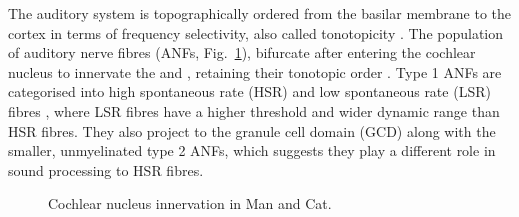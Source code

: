 
The auditory system is topographically ordered from the basilar membrane to the
cortex in terms of frequency selectivity, also called tonotopicity
\citep{YoungOertel:2004}.  The population of auditory nerve fibres (ANFs,
Fig.~\ref{fig:CNdiagram}), bifurcate after entering the cochlear nucleus to
innervate the \VCN and \DCN\@, retaining their tonotopic order
\citep{Lorente:1981, Liberman:1982, Liberman:1993}. Type 1 ANFs are categorised
into high spontaneous rate (HSR) and low spontaneous rate (LSR) fibres
\citep{Liberman:1978}, where LSR fibres have a higher threshold and wider
dynamic range than HSR fibres. They also project to the granule cell domain
(GCD) \citep{RyugoParks:2003, RyugoHaenggeliEtAl:2003} along with the smaller,
unmyelinated type 2 ANFs, which suggests they play a different role in sound
processing to HSR fibres.


\begin{figure}[tbh]
  \begin{center}
    \caption{Cochlear nucleus innervation in Man and Cat. \citep[!find out which publication printed this!]{RyugoParks:2003,Ryugo:1992,Spoendlin:1973}}
    \label{fig:CNdiagram}
  \end{center}
\end{figure}






